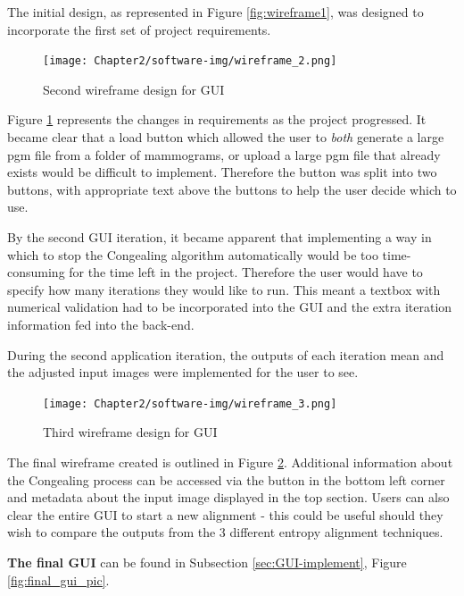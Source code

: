 The initial design, as represented in Figure \ref{fig:wireframe1}, was designed to incorporate the first set of project requirements.

\begin{figure}[H]
  \center
  \texttt{[image: Chapter2/software-img/wireframe\_2.png]}
  \caption{Second wireframe design for GUI}
  \label{fig:wireframe2}
\end{figure}

Figure \ref{fig:wireframe2} represents the changes in requirements as the project progressed. It became clear that a load button which allowed the user to \textit{both} generate a large pgm file from a folder of mammograms, or upload a large pgm file that already exists would be difficult to implement. Therefore the button was split into two buttons, with appropriate text above the buttons to help the user decide which to use.

By the second \acrshort{GUI} iteration, it became apparent that implementing a way in which to stop the \Gls{Congealing} algorithm automatically would be too time-consuming for the time left in the project. Therefore the user would have to specify how many iterations they would like to run. This meant a textbox with numerical validation had to be incorporated into the \acrshort{GUI} and the extra iteration information fed into the back-end.

During the second application iteration, the outputs of each iteration mean and the adjusted input images were implemented for the user to see.

\begin{figure}[H]
  \center
  \texttt{[image: Chapter2/software-img/wireframe\_3.png]}
  \caption{Third wireframe design for GUI}
  \label{fig:wireframe3}
\end{figure}
The final wireframe created is outlined in Figure \ref{fig:wireframe3}. Additional information  about the \Gls{Congealing} process can be accessed via the button in the bottom left corner and metadata about the input image displayed in the top section. Users can also clear the entire \acrshort{GUI} to start a new alignment - this could be useful should they wish to compare the outputs from the 3 different entropy alignment techniques.

\noindent \textbf{The final \acrshort{GUI}} can be found in Subsection \ref{sec:GUI-implement}, Figure \ref{fig:final_gui_pic}.
